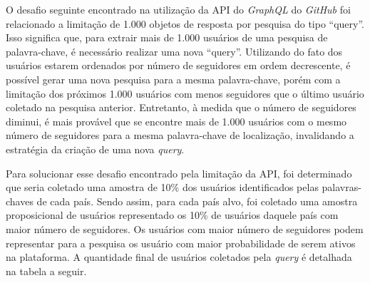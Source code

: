 \documentclass[12pt]{article}
\begin{document}
O desafio seguinte encontrado na utilização da API do \textit{GraphQL} do \textit{GitHub} foi relacionado a limitação de 1.000 objetos de resposta por pesquisa do tipo ``query''. Isso significa que, para extrair mais de 1.000 usuários de uma pesquisa de palavra-chave, é necessário realizar uma nova ``query''. Utilizando do fato dos usuários estarem ordenados por número de seguidores em ordem decrescente, é possível gerar uma nova pesquisa para a mesma palavra-chave, porém com a limitação dos próximos 1.000 usuários com menos seguidores que o último usuário coletado na pesquisa anterior. Entretanto, à medida que o número de seguidores diminui, é mais provável que se encontre mais de 1.000 usuários com o mesmo número de seguidores para a mesma palavra-chave de localização, invalidando a estratégia da criação de uma nova \emph{query}.

Para solucionar esse desafio encontrado pela limitação da API, foi determinado que seria coletado uma amostra de 10\% dos usuários identificados pelas palavras-chaves de cada país. Sendo assim, para cada país alvo, foi coletado uma amostra proposicional de usuários representado os 10\% de usuários daquele país com maior número de seguidores. Os usuários com maior número de seguidores podem representar para a pesquisa os usuário com maior probabilidade de serem ativos na plataforma. A quantidade final de usuários coletados pela \emph{query} é detalhada na tabela a seguir.
\end{document}
